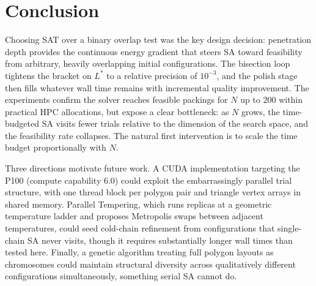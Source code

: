 \documentclass[10pt,twocolumn]{article}
\begin{document}
\section{Conclusion}
\label{sec:conclusion}

Choosing SAT over a binary overlap test was the key design decision:
penetration depth provides the continuous energy gradient that steers
SA toward feasibility from arbitrary, heavily overlapping initial
configurations. The bisection loop tightens the bracket on $L^*$ to a
relative precision of $10^{-3}$, and the polish stage then fills
whatever wall time remains with incremental quality improvement. The
experiments confirm the solver reaches feasible packings for $N$ up to
200 within practical HPC allocations, but expose a clear bottleneck:
as $N$ grows, the time-budgeted SA visits fewer trials relative to the
dimension of the search space, and the feasibility rate collapses. The
natural first intervention is to scale the time budget proportionally
with $N$.

Three directions motivate future work. A CUDA implementation targeting
the P100 (compute capability 6.0) could exploit the embarrassingly
parallel trial structure, with one thread block per polygon pair and
triangle vertex arrays in shared memory. Parallel Tempering, which
runs replicas at a geometric temperature ladder and proposes Metropolis
swaps between adjacent temperatures, could seed cold-chain refinement
from configurations that single-chain SA never visits, though it
requires substantially longer wall times than tested here. Finally, a
genetic algorithm treating full polygon layouts as chromosomes could
maintain structural diversity across qualitatively different
configurations simultaneously, something serial SA cannot do.
\end{document}
